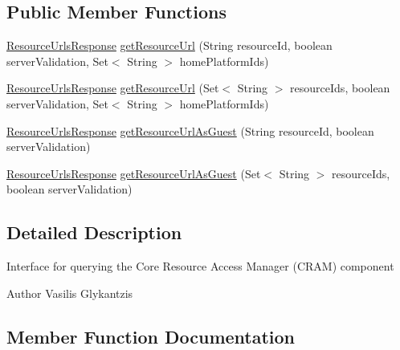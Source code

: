 \subsection*{Public Member Functions}
\begin{DoxyCompactItemize}
\item 
\hyperlink{classeu_1_1h2020_1_1symbiote_1_1core_1_1internal_1_1cram_1_1ResourceUrlsResponse}{Resource\+Urls\+Response} \hyperlink{interfaceeu_1_1h2020_1_1symbiote_1_1client_1_1interfaces_1_1CRAMClient_a63e6b3e78c7fb0872dfe0652bdaa0888}{get\+Resource\+Url} (String resource\+Id, boolean server\+Validation, Set$<$ String $>$ home\+Platform\+Ids)
\item 
\hyperlink{classeu_1_1h2020_1_1symbiote_1_1core_1_1internal_1_1cram_1_1ResourceUrlsResponse}{Resource\+Urls\+Response} \hyperlink{interfaceeu_1_1h2020_1_1symbiote_1_1client_1_1interfaces_1_1CRAMClient_adab47fb8c60efe016c453d432db266da}{get\+Resource\+Url} (Set$<$ String $>$ resource\+Ids, boolean server\+Validation, Set$<$ String $>$ home\+Platform\+Ids)
\item 
\hyperlink{classeu_1_1h2020_1_1symbiote_1_1core_1_1internal_1_1cram_1_1ResourceUrlsResponse}{Resource\+Urls\+Response} \hyperlink{interfaceeu_1_1h2020_1_1symbiote_1_1client_1_1interfaces_1_1CRAMClient_a97c634fa1b97dba4a989360cc26b7b8d}{get\+Resource\+Url\+As\+Guest} (String resource\+Id, boolean server\+Validation)
\item 
\hyperlink{classeu_1_1h2020_1_1symbiote_1_1core_1_1internal_1_1cram_1_1ResourceUrlsResponse}{Resource\+Urls\+Response} \hyperlink{interfaceeu_1_1h2020_1_1symbiote_1_1client_1_1interfaces_1_1CRAMClient_a6786832b14a691accf53af3c825ae7e2}{get\+Resource\+Url\+As\+Guest} (Set$<$ String $>$ resource\+Ids, boolean server\+Validation)
\end{DoxyCompactItemize}


\subsection{Detailed Description}
Interface for querying the Core Resource Access Manager (C\+R\+AM) component

\begin{DoxyAuthor}{Author}
Vasilis Glykantzis 
\end{DoxyAuthor}


\subsection{Member Function Documentation}
\mbox{\label{interfaceeu_1_1h2020_1_1symbiote_1_1client_1_1interfaces_1_1CRAMClient_a63e6b3e78c7fb0872dfe0652bdaa0888}} 
